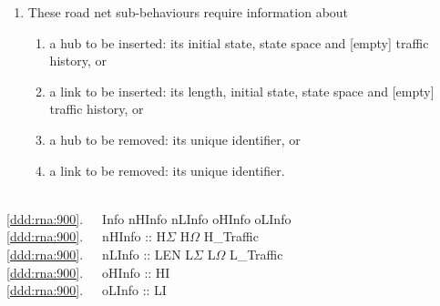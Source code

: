 {\mnewfoil
\begin{enumerate}\setei
\item  \label{ddd:rna:900} These road net sub-behaviours require information about
\begin{enumerate}
\item  \label{ddd:rna:910} a hub to be inserted: its
                           initial state, state space and [empty]
                           traffic history, or 
\item  \label{ddd:rna:920} a link to be inserted:
                           its length, initial state, state space and
                           [empty] traffic history, or
\item  \label{ddd:rna:930} a hub to be removed: its
                           unique identifier, or
\item  \label{ddd:rna:940} a link to be removed: its
                           unique identifier.
\end{enumerate}
\savei\end{enumerate}
\bp
{}\\
\ref{ddd:rna:900}.\ \ \ Info {\EQ}{\EQ} nHInfo {\BAR} nLInfo {\BAR} oHInfo {\BAR} oLInfo\\
\ref{ddd:rna:900}.\ \ \ nHInfo :: H$\Sigma$ {\TIMES} H$\Omega$ {\TIMES} H\_Traffic\\
\ref{ddd:rna:900}.\ \ \ nLInfo :: LEN {\TIMES} L$\Sigma$ {\TIMES} L$\Omega$ {\TIMES} L\_Traffic \\
\ref{ddd:rna:900}.\ \ \ oHInfo :: HI\\
\ref{ddd:rna:900}.\ \ \ oLInfo :: LI \dbsquare
\ep
}

\mnewfoil

